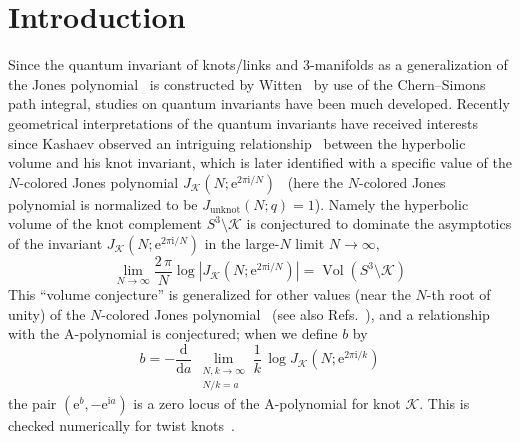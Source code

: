\documentclass[12pt,reqno]{amsart}
\numberwithin{equation}{section}
\renewcommand{\thefootnote}{\fnsymbol{footnote}}
\DeclareMathOperator{\Vol}{Vol}
\newcommand{\I}{\mathrm{i}}
\newcommand{\E}{\mathrm{e}}
\begin{document}



\maketitle
\renewcommand{\thefootnote}{\arabic{footnote}}


\section{Introduction}

Since the quantum invariant of knots/links and 3-manifolds
as a generalization of the Jones polynomial~\cite{Jones85} is
constructed by Witten~\cite{EWitt89a} by use of the Chern--Simons path
integral, studies on quantum invariants have been much developed.
Recently
geometrical
interpretations of the quantum invariants
have received  interests  since
Kashaev  observed an  intriguing relationship~\cite{Kasha96b}
between
the hyperbolic
volume and his knot invariant,
which  is later identified with a specific value of the
$N$-colored Jones polynomial
$J_{\mathcal{K}}
\left(
  N ; \E^{2 \pi \I/N}
\right)$~\cite{MuraMura99a}
(here the $N$-colored Jones polynomial is normalized to be
$J_{\text{unknot}}(N;q)=1$).
Namely the hyperbolic volume of the knot complement
$S^3 \setminus \mathcal{K}$
is conjectured to dominate the asymptotics of the invariant
$J_\mathcal{K}\left(N ; \E^{2 \pi \I  /  N}\right)$ in the
large-$N$ limit
$N\to \infty$,
\begin{equation}
  \lim_{N\to \infty} \frac{2 \, \pi}{N}
  \log \left| J_\mathcal{K}
    \left( N; \E^{2 \pi \I / N} \right) \right|
  = \Vol(S^3 \setminus \mathcal{K})
\end{equation}
This ``volume conjecture'' is generalized for other values (near the
$N$-th root of unity) of the $N$-colored Jones polynomial~\cite{SGuko03a}
(see also Refs.~), and a relationship with the
A-polynomial is conjectured;
when we define $b$ by
\begin{equation}
  \label{Gukov_conjecture}
  b
  = -
  \frac{\mathrm{d}}{\mathrm{d} a} \,
  \lim_{
    \substack{
      N, k \to \infty
      \\
      N/k = a}}
  \frac{1}{k} \,
  \log J_{\mathcal{K}} \left( N; \E^{2 \pi \I/k} \right)
\end{equation}
the pair
$\left(\E^b, - \E^{\I a} \right)$ is a zero locus of the A-polynomial for
knot $\mathcal{K}$.
This is checked numerically for twist knots~\cite{KHikami04c}.
\end{document}
